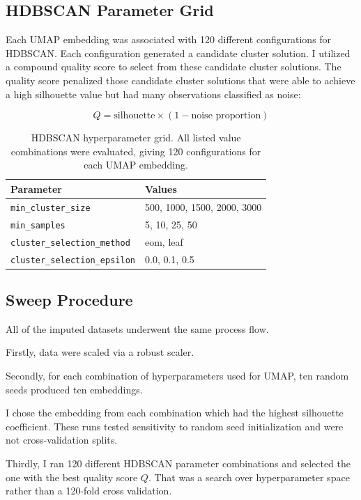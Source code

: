 \subsection{HDBSCAN Parameter Grid}
Each UMAP embedding was associated with 120 different configurations for HDBSCAN. Each configuration generated a candidate cluster solution. I utilized a compound quality score to select from these candidate cluster solutions. The quality score penalized those candidate cluster solutions that were able to achieve a high silhouette value but had many observations classified as noise:

\begin{equation}
Q = \text{silhouette} \times (1 - \text{noise proportion})
\label{eq:quality}
\end{equation}

\begin{table}[ht]
\caption{HDBSCAN hyperparameter grid. All listed value combinations were evaluated, giving 120 configurations for each UMAP embedding.}
\label{tab:hdbscan_grid}
\centering
\begin{tabular}{l l}
\toprule
\textbf{Parameter} & \textbf{Values} \\
\midrule
\texttt{min\_cluster\_size}          & 500, 1000, 1500, 2000, 3000 \\
\texttt{min\_samples}                & 5, 10, 25, 50 \\
\texttt{cluster\_selection\_method}  & eom, leaf \\
\texttt{cluster\_selection\_epsilon} & 0.0, 0.1, 0.5 \\
\bottomrule
\end{tabular}
\end{table}

\subsection{Sweep Procedure}
All of the imputed datasets underwent the same process flow.

Firstly, data were scaled via a robust scaler.

Secondly, for each combination of hyperparameters used for UMAP, ten random seeds produced ten embeddings.

I chose the embedding from each combination which had the highest silhouette coefficient. These runs tested sensitivity to random seed initialization and were not cross-validation splits.

Thirdly, I ran 120 different HDBSCAN parameter combinations and selected the one with the best quality score \(Q\). That was a search over hyperparameter space rather than a 120-fold cross validation.

